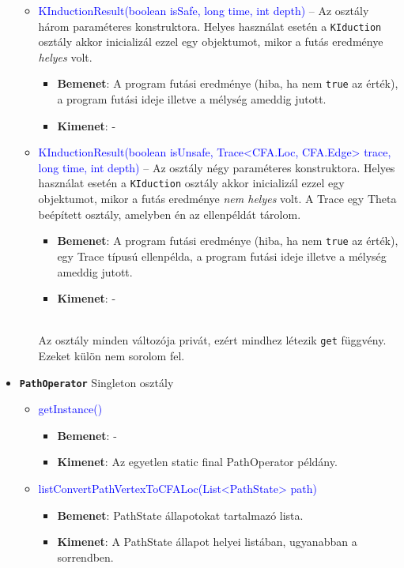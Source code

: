 \begin{itemize}
\begin{itemize}
		\item \textcolor{blue}{KInductionResult(boolean isSafe, long time, int depth)} -- Az osztály három paraméteres konstruktora. Helyes használat esetén a \texttt{KIduction} osztály akkor inicializál ezzel egy objektumot, mikor a futás eredménye \textit{helyes} volt.
		\begin{itemize}
			\item \textbf{Bemenet}: A program futási eredménye (hiba, ha nem \texttt{true} az érték), a program futási ideje illetve a mélység ameddig jutott.
			\item \textbf{Kimenet}: -
		\end{itemize}
	
		\item \textcolor{blue}{KInductionResult(boolean isUnsafe, Trace<CFA.Loc, CFA.Edge> trace, long time, int depth)} -- Az osztály négy paraméteres konstruktora. Helyes használat esetén a \texttt{KIduction} osztály akkor inicializál ezzel egy objektumot, mikor a futás eredménye \textit{nem helyes} volt. A Trace egy Theta beépített osztály, amelyben én az ellenpéldát tárolom.
		\begin{itemize}
			\item \textbf{Bemenet}: A program futási eredménye (hiba, ha nem \texttt{true} az érték), egy Trace típusú ellenpélda, a program futási ideje illetve a mélység ameddig jutott.
			\item \textbf{Kimenet}: -
		\end{itemize}
		\ \\
		Az osztály minden változója privát, ezért mindhez létezik \texttt{get} függvény. Ezeket külön nem sorolom fel.
	\end{itemize}

	\item \textbf{\texttt{PathOperator}} Singleton osztály
	\begin{itemize}
		\item \textcolor{blue}{getInstance()}
		\begin{itemize}
			\item \textbf{Bemenet}: -
			\item \textbf{Kimenet}: Az egyetlen static final PathOperator példány.
		\end{itemize}
	
		\item \textcolor{blue}{listConvertPathVertexToCFALoc(List<PathState> path)}
		\begin{itemize}
			\item \textbf{Bemenet}: PathState állapotokat tartalmazó lista.
			\item \textbf{Kimenet}: A PathState állapot helyei listában, ugyanabban a sorrendben.
		\end{itemize}
	

\end{itemize}
\end{itemize}
